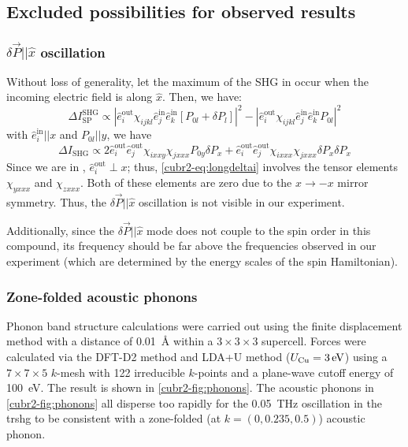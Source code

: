 \subsection{Excluded possibilities for observed results}\label{cubr2-sup:excluded}
\subsubsection{$\delta \vec{P} || \hat{x}$ oscillation\label{cubr2-sup:nopxmode}}

Without loss of generality, let the maximum of the SHG in \SP occur when the incoming electric field is along $\hat{x}$.
Then, we have:
\begin{equation}
\Delta I_\mathrm{SP}^\mathrm{SHG} \propto |\hat{e}^\mathrm{out}_i \chi_{ijkl}\hat{e}^\mathrm{in}_j\hat{e}^\mathrm{in}_k[P_{0l}+\delta P_l]|^2-|\hat{e}^\mathrm{out}_i \chi_{ijkl}\hat{e}^\mathrm{in}_j\hat{e}^\mathrm{in}_kP_{0l}|^2
\end{equation}
with $\hat{e}^\mathrm{in}_i || x$ and $P_{0l} || y$, we have
\begin{equation}
\label{cubr2-eq:longdeltai}
\Delta I_\mathrm{SHG} \propto 2\hat{e}^\mathrm{out}_i \hat{e}^\mathrm{out}_j\chi_{ixxy} \chi_{jxxx}P_{0y}\delta P_x + \hat{e}^\mathrm{out}_i \hat{e}^\mathrm{out}_j\chi_{ixxx} \chi_{jxxx}\delta P_x\delta P_x 
\end{equation}
Since we are in \SP, $\hat{e}^\mathrm{out}_i \perp x$; thus, \cref{cubr2-eq:longdeltai} involves the tensor elements $\chi_{yxxx}$ and $\chi_{zxxx}$.
Both of these elements are zero due to the $x \rightarrow -x$ mirror symmetry.
Thus, the $\delta \vec{P} || \hat{x}$ oscillation is not visible in our experiment.

Additionally, since the $\delta \vec{P} || \hat{x}$ mode does not couple to the spin order in this compound\cite{katsura_dynamical_2007}, its frequency should be far above the frequencies observed in our experiment (which are determined by the energy scales of the spin Hamiltonian).

\subsubsection{Zone-folded acoustic phonons}\label{cubr2-sup:phonons}

Phonon band structure calculations were carried out using the finite displacement method\citep{togo_first_2015} with a distance of \qty{0.01}{\angstrom} within a $3\times3\times3$ supercell.
Forces were calculated via the DFT-D2 method\cite{grimme_semiempirical_2006} and LDA+U method\cite{dudarev_electron-energy-loss_1998} ($U_\mathrm{\ce{Cu}}=\qty{3}{eV}$) using a $7\times7\times5$ $k$-mesh with \num{122} irreducible $k$-points and a plane-wave cutoff energy of \qty{100}{eV}.
The result is shown in \cref{cubr2-fig:phonons}.
The acoustic phonons in \cref{cubr2-fig:phonons} all disperse too rapidly for the \qty{0.05}{THz} oscillation in the \gls{trshg} to be consistent with a zone-folded (at $k=(0, 0.235, 0.5)$) acoustic phonon.


